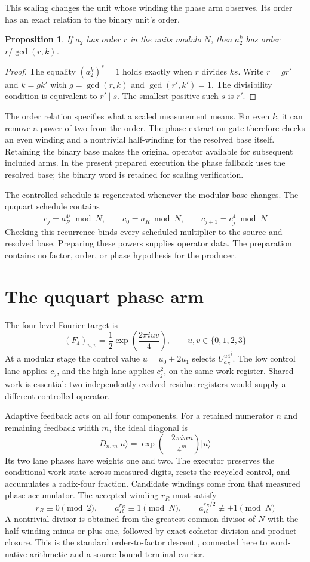 \documentclass[12pt]{article}
\newtheorem{proposition}{Proposition}
\newcommand{\ket}[1]{\lvert #1\rangle}
\begin{document}
This scaling changes the unit whose winding the phase arm observes. Its order has an exact relation to the binary unit's order.

\begin{proposition}
If $a_2$ has order $r$ in the units modulo $N$, then $a_2^k$ has order $r/\gcd(r,k)$.
\end{proposition}
\begin{proof}
The equality $(a_2^k)^s=1$ holds exactly when $r$ divides $ks$. Write $r=gr'$ and $k=gk'$ with $g=\gcd(r,k)$ and $\gcd(r',k')=1$. The divisibility condition is equivalent to $r'\mid s$. The smallest positive such $s$ is $r'$.
\end{proof}

The order relation specifies what a scaled measurement means. For even $k$, it can remove a power of two from the order. The phase extraction gate therefore checks an even winding and a nontrivial half-winding for the resolved base itself. Retaining the binary base makes the original operator available for subsequent included arms. In the present prepared execution the phase fallback uses the resolved base; the binary word is retained for scaling verification.

The controlled schedule is regenerated whenever the modular base changes. The ququart schedule contains
\[
c_j=a_R^{4^j}\bmod N,\qquad c_0=a_R\bmod N,
\qquad c_{j+1}=c_j^4\bmod N
\]
Checking this recurrence binds every scheduled multiplier to the source and resolved base. Preparing these powers supplies operator data. The preparation contains no factor, order, or phase hypothesis for the producer.

\section*{The ququart phase arm}

The four-level Fourier target is
\[
(F_4)_{u,v}=\frac12\exp\!\left(\frac{2\pi iuv}{4}\right),
\qquad u,v\in\{0,1,2,3\}
\]
At a modular stage the control value $u=u_0+2u_1$ selects $U_{a_R}^{u4^j}$. The low control lane applies $c_j$, and the high lane applies $c_j^2$, on the same work register. Shared work is essential: two independently evolved residue registers would supply a different controlled operator.

Adaptive feedback acts on all four components. For a retained numerator $n$ and remaining feedback width $m$, the ideal diagonal is
\[
D_{n,m}\ket{u}=\exp\!\left(-\frac{2\pi iun}{4^m}\right)\ket{u}
\]
Its two lane phases have weights one and two. The executor preserves the conditional work state across measured digits, resets the recycled control, and accumulates a radix-four fraction. Candidate windings come from that measured phase accumulator. The accepted winding $r_R$ must satisfy
\[
r_R\equiv0\pmod2,\qquad a_R^{r_R}\equiv1\pmod N,
\qquad a_R^{r_R/2}\not\equiv\pm1\pmod N
\]
A nontrivial divisor is obtained from the greatest common divisor of $N$ with the half-winding minus or plus one, followed by exact cofactor division and product closure. This is the standard order-to-factor descent \cite{shor}, connected here to word-native arithmetic and a source-bound terminal carrier.
\end{document}
